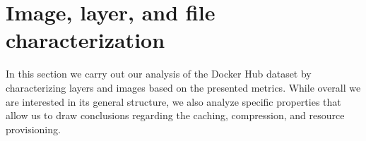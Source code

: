 \section{Image, layer, and file characterization}
\label{sec:char}



In this section we carry out our analysis of the Docker Hub dataset by characterizing
layers and images based on
the presented metrics. While overall we are interested in its general structure,
we also analyze specific properties that allow us to draw conclusions regarding the
caching, compression, and resource provisioning.







